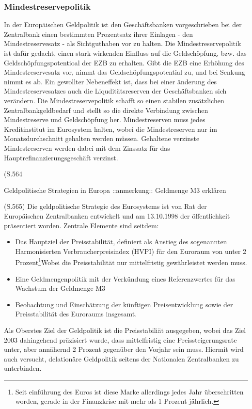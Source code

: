 \documentclass[
  onecolumn,
  a4paper,
  abstracton,
  parskip=half
  ,final
  ]{scrartcl}
\begin{document}
\subsubsection{Mindestreservepolitik} \citep[vgl.][S.562f]{Basseler2010}
In der Europ{\"a}ischen Geldpolitik ist den Gesch{\"a}ftsbanken vorgeschrieben bei der Zentralbank einen bestimmten Prozentsatz ihrer Einlagen - den Mindestreservesatz - als Sichtguthaben vor zu halten. Die Mindestreservepolitik ist daf{\"u}r gedacht, einen stark wirkenden Einfluss auf die Geldsch{\"o}pfung, bzw. das Geldsch{\"o}pfungspotentioal der EZB zu erhalten. Gibt die EZB eine Erh{\"o}hung des Mindestreservesatz vor, nimmt das Geldsch{\"o}pfungspotential zu, und bei Senkung nimmt es ab. Ein gewollter Nebeneffekt ist, dass bei einer {\"a}nderung des Mindestreservesatzes auch die Liqudit{\"a}tsreserven der Gesch{\"a}ftsbanken sich ver{\"a}ndern.
Die Mindestreservepolitik schafft so einen stabilen zus{\"a}tzlichen Zentralbankgeldbedarf und stellt so die direkte Verbindung zwischen Mindestreserve und Geldsch{\"o}pfung her.
Mindestreserven muss jedes Kreditinstitut im Eurosystem halten, wobei die Mindestreserven nur im Monatsdurchschnitt gehalten werden m{\"u}ssen. Gehaltene verzinste Mindestreserven werden dabei mit dem Zinssatz f{\"u}r das Hauptrefinanzierungsgesch{\"a}ft verzinst.


(S.564\citep[vgl.][S.564-568]{Basseler2010}

Geldpolitische Strategien in Europa
::anmerkung:: Geldmenge M3 erkl{\"a}ren

(S.565)
Die geldpolitische Strategie des Eurosystems ist von Rat der Europ{\"a}ischen Zentralbanken entwickelt und am 13.10.1998 der {\"o}ffentlichkeit pr{\"a}sentiert worden.
Zentrale Elemente sind seitdem:
\begin{itemize}
  \item{Das Hauptziel der Preisstabilit{\"a}t, definiert als Anstieg des sogenannten Harmonisierten Verbraucherpreisindex (HVPI) f{\"u}r den Euroraum von unter 2 Prozent\footnote[78]{Seit einf{\"u}hrung des Euros ist diese Marke allerdings jedes Jahr {\"u}berschritten worden, gerade in der Finanzkrise mit mehr als 1 Prozent j{\"a}hrlich.}Wobei die Preisstabilit{\"a}t nur mittelfristig gew{\"a}hrleistet werden muss. %
  }
  \item{Eine Geldmengenpolitik mit der Verk{\"u}ndung eines Referenzwertes f{\"u}r das Wachstum der Geldmenge M3}
  \item{Beobachtung und Einsch{\"a}tzung der k{\"u}nftigen Preisentwicklung sowie der Preisstabilit{\"a}t des Euroraums insgesamt.}
\end{itemize}
Als Oberstes Ziel der Geldpolitik ist die Preisstabili{\"a}t ausgegeben, wobei das Ziel 2003 dahingehend pr{\"a}zisiert wurde, dass mittelfristig eine Preissteigerungsrate unter, aber ann{\"a}hernd 2 Prozent gegen{\"u}ber den Vorjahr sein muss. Hiermit wird auch versucht, delation{\"a}re Geldpolitik seitens der Nationalen Zentralbanken zu unterbinden.
\end{document}
